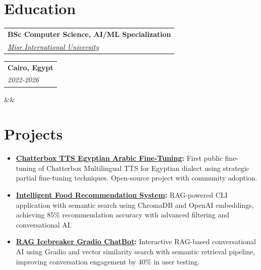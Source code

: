 \documentclass[11pt,a4paper,sans]{moderncv}
\makeatletter
\newcommand*{\customcventry}[7][.13em]{
\begin{tabular}{@{}l}
{\bfseries #4} \\
{\itshape #3}
\end{tabular}
\hfill
\begin{tabular}{l@{}}
{\bfseries #5} \\
{\itshape #2}
\end{tabular}
\ifx&#7&%
\else{\
\begin{minipage}{\maincolumnwidth}%
\small#7%
\end{minipage}}\fi%
\par\addvspace{#1}}
\makeatother
\begin{document}
\section{Education}
\customcventry{2022-2026}{\color{blue}\href{https://www.miuegypt.edu.eg/}{Misr International University}}{BSc Computer Science, AI/ML Specialization}{Cairo, Egypt}{}{}{}

\section{Projects}
{\begin{itemize}[label=\textbullet]

\item {\textbf{\href{https://github.com/AliAbdallah21/Chatterbox-Multilingual-TTS-Fine-Tuning}{Chatterbox TTS Egyptian Arabic Fine-Tuning}:} First public fine-tuning of Chatterbox Multilingual TTS for Egyptian dialect using strategic partial fine-tuning techniques. Open-source project with community adoption.}
\item {\textbf{\href{https://github.com/AliAbdallah21/Food-Recommendation-System}{Intelligent Food Recommendation System}:} RAG-powered CLI application with semantic search using ChromaDB and OpenAI embeddings, achieving 85\% recommendation accuracy with advanced filtering and conversational AI.}
\item {\textbf{\href{https://github.com/AliAbdallah21/RAG-Icebreaker-Gradio-ChatBot}{RAG Icebreaker Gradio ChatBot}:} Interactive RAG-based conversational AI using Gradio and vector similarity search with semantic retrieval pipeline, improving conversation engagement by 40\% in user testing.}

\end{itemize}}
\end{document}

